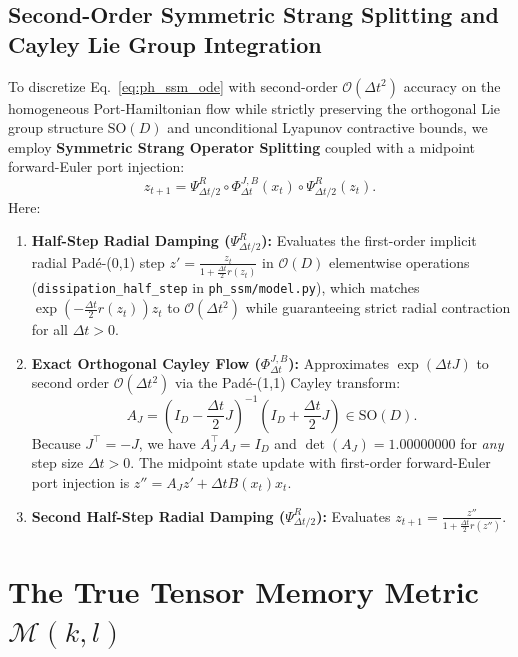 \documentclass[11pt,a4paper]{article}
\begin{document}
\subsection{Second-Order Symmetric Strang Splitting and Cayley Lie Group Integration}
To discretize Eq.~\eqref{eq:ph_ssm_ode} with second-order $\mathcal{O}(\Delta t^2)$ accuracy on the homogeneous Port-Hamiltonian flow while strictly preserving the orthogonal Lie group structure $\mathrm{SO}(D)$ and unconditional Lyapunov contractive bounds, we employ \textbf{Symmetric Strang Operator Splitting} \cite{strang1968construction} coupled with a midpoint forward-Euler port injection:
\begin{equation}
    z_{t+1} = \Psi_{\Delta t / 2}^R \circ \Phi_{\Delta t}^{J, B}(x_t) \circ \Psi_{\Delta t / 2}^R (z_t).
    \label{eq:strang_splitting}
\end{equation}
Here:
\begin{enumerate}
    \item \textbf{Half-Step Radial Damping ($\Psi_{\Delta t / 2}^R$):} Evaluates the first-order implicit radial Pad\'e-(0,1) step $z' = \frac{z_t}{1 + \frac{\Delta t}{2} r(z_t)}$ in $\mathcal{O}(D)$ elementwise operations (\texttt{dissipation\_half\_step} in \texttt{ph\_ssm/model.py}), which matches $\exp(-\frac{\Delta t}{2}r(z_t))z_t$ to $\mathcal{O}(\Delta t^2)$ while guaranteeing strict radial contraction for all $\Delta t > 0$.
    \item \textbf{Exact Orthogonal Cayley Flow ($\Phi_{\Delta t}^{J, B}$):} Approximates $\exp(\Delta t J)$ to second order $\mathcal{O}(\Delta t^2)$ via the Padé-(1,1) Cayley transform:
    \begin{equation}
        A_J = \left(I_D - \frac{\Delta t}{2} J\right)^{-1} \left(I_D + \frac{\Delta t}{2} J\right) \in \mathrm{SO}(D).
        \label{eq:cayley_transform}
    \end{equation}
    Because $J^\top = -J$, we have $A_J^\top A_J = I_D$ and $\det(A_J) = 1.00000000$ for \textit{any} step size $\Delta t > 0$. The midpoint state update with first-order forward-Euler port injection is $z'' = A_J z' + \Delta t B(x_t) x_t$.
    \item \textbf{Second Half-Step Radial Damping ($\Psi_{\Delta t / 2}^R$):} Evaluates $z_{t+1} = \frac{z''}{1 + \frac{\Delta t}{2} r(z'')}$.
\end{enumerate}

\section{The True Tensor Memory Metric $\mathcal{M}(k, l)$}
\label{sec:tensor_memory_metric}
\end{document}
